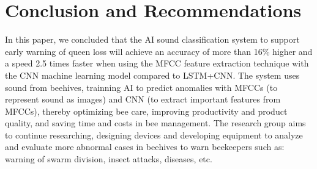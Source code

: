 \section{Conclusion and Recommendations}
In this paper, we concluded that the AI sound classification system to support early
warning of queen loss will achieve an accuracy of more than 16\% higher and a speed
2.5 times faster when using the MFCC feature extraction technique with the CNN machine
learning model compared to LSTM+CNN. The system uses  sound from beehives, trainning AI
to predict anomalies with MFCCs (to represent sound as images) and CNN
(to extract important features from MFCCs), thereby optimizing bee care, improving
productivity and product quality, and saving time and costs in bee management. The
research group aims to continue researching, designing devices and developing equipment
to analyze and evaluate more abnormal cases in beehives to warn beekeepers such as:
warning of swarm division, insect attacks, diseases, etc.
